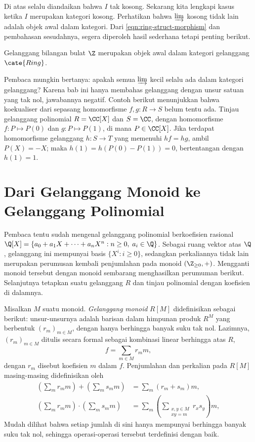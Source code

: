 Di atas selalu diandaikan bahwa $I$ tak kosong. Sekarang kita lengkapi kasus ketika $I$ merupakan kategori kosong. Perhatikan bahwa $\varinjlim$ kosong tidak lain adalah objek awal dalam kategori. Dari \eqref{eqn:ring-struct-morphism} dan pembahasan sesudahnya, segera diperoleh hasil sederhana tetapi penting berikut.
\begin{proposition}
	Gelanggang bilangan bulat $\Z$ merupakan objek awal dalam kategori gelanggang $\cate{Ring}$.
\end{proposition}

Pembaca mungkin bertanya: apakah semua $\varinjlim$ kecil selalu ada dalam kategori gelanggang? Karena bab ini hanya membahas gelanggang dengan unsur satuan yang tak nol, jawabannya negatif. Contoh berikut menunjukkan bahwa koekualiser dari sepasang homomorfisme $f,g: R \to S$ belum tentu ada. Tinjau gelanggang polinomial $R = \CC[X]$ dan $S = \CC$, dengan homomorfisme $f: P \mapsto P(0)$ dan $g: P \mapsto P(1)$, di mana $P \in \CC[X]$. Jika terdapat homomorfisme gelanggang $h: S \to T$ yang memenuhi $hf=hg$, ambil $P(X)=-X$; maka $h(1) = h(P(0)-P(1)) = 0$, bertentangan dengan $h(1)=1$.

\section{Dari Gelanggang Monoid ke Gelanggang Polinomial}\label{sec:polynomial-ring}
Pembaca tentu sudah mengenal gelanggang polinomial berkoefisien rasional $\Q[X] = \left\{ a_0 + a_1 X + \cdots + a_n X^n : n \geq 0, \; a_i \in \Q \right\}$. Sebagai ruang vektor atas $\Q$, gelanggang ini mempunyai basis $\{ X^i : i \geq 0 \}$, sedangkan perkaliannya tidak lain merupakan perumusan kembali penjumlahan pada monoid $(\Z_{\geq 0}, +)$. Mengganti monoid tersebut dengan monoid sembarang menghasilkan perumuman berikut. Selanjutnya tetapkan suatu gelanggang $R$ dan tinjau polinomial dengan koefisien di dalamnya.

\begin{definition}\label{def:monoidal-ring}
	Misalkan $M$ suatu monoid. \emph{Gelanggang monoid} $R[M]$ didefinisikan sebagai berikut: unsur-unsurnya adalah barisan dalam himpunan produk $R^M$ yang berbentuk $(r_m)_{m \in M}$, dengan hanya berhingga banyak suku tak nol. Lazimnya, $(r_m)_{m \in M}$ ditulis secara formal sebagai kombinasi linear berhingga atas $R$,
	\[ f = \sum_{m \in M} r_m m, \]
	dengan $r_m$ disebut koefisien $m$ dalam $f$. Penjumlahan dan perkalian pada $R[M]$ masing-masing didefinisikan oleh
	\begin{align*}
		\left( \sum_m r_m m \right) + \left( \sum_m s_m m \right) & = \sum_m (r_m + s_m) m, \\
		\left( \sum_m r_m m \right) \cdot \left( \sum_m s_m m \right) & = \sum_m \left( \sum_{\substack{x, y \in M \\ xy=m}} r_x s_y \right) m,
	\end{align*}
	Mudah dilihat bahwa setiap jumlah di sini hanya mempunyai berhingga banyak suku tak nol, sehingga operasi-operasi tersebut terdefinisi dengan baik.
\end{definition}

